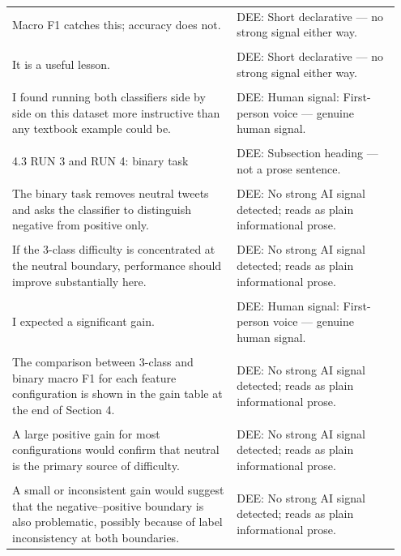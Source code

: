 \documentclass[11pt]{article}
\begin{document}
\begin{longtable}{|p{0.55\linewidth}|p{0.40\linewidth}|}
\hline
\rule{0pt}{3.5cm} & \\
\hline
Macro F1 catches this; accuracy does not. & DEE: Short declarative --- no strong signal either way. \\[2pt]
\hline
\rule{0pt}{3.5cm} & \\
\hline
It is a useful lesson. & DEE: Short declarative --- no strong signal either way. \\[2pt]
\hline
\rule{0pt}{3.5cm} & \\
\hline
I found running both classifiers side by side on this dataset more instructive than any textbook example could be. & DEE: Human signal: First-person voice --- genuine human signal. \\[2pt]
\hline
\rule{0pt}{3.5cm} & \\
\hline
4.3 RUN 3 and RUN 4: binary task & DEE: Subsection heading --- not a prose sentence. \\[2pt]
\hline
\rule{0pt}{3.5cm} & \\
\hline
The binary task removes neutral tweets and asks the classifier to distinguish negative from positive only. & DEE: No strong AI signal detected; reads as plain informational prose. \\[2pt]
\hline
\rule{0pt}{3.5cm} & \\
\hline
If the 3-class difficulty is concentrated at the neutral boundary, performance should improve substantially here. & DEE: No strong AI signal detected; reads as plain informational prose. \\[2pt]
\hline
\rule{0pt}{3.5cm} & \\
\hline
I expected a significant gain. & DEE: Human signal: First-person voice --- genuine human signal. \\[2pt]
\hline
\rule{0pt}{3.5cm} & \\
\hline
The comparison between 3-class and binary macro F1 for each feature configuration is shown in the gain table at the end of Section 4. & DEE: No strong AI signal detected; reads as plain informational prose. \\[2pt]
\hline
\rule{0pt}{3.5cm} & \\
\hline
A large positive gain for most configurations would confirm that neutral is the primary source of difficulty. & DEE: No strong AI signal detected; reads as plain informational prose. \\[2pt]
\hline
\rule{0pt}{3.5cm} & \\
\hline
A small or inconsistent gain would suggest that the negative--positive boundary is also problematic, possibly because of label inconsistency at both boundaries. & DEE: No strong AI signal detected; reads as plain informational prose. \\[2pt]

\end{longtable}
\end{document}
